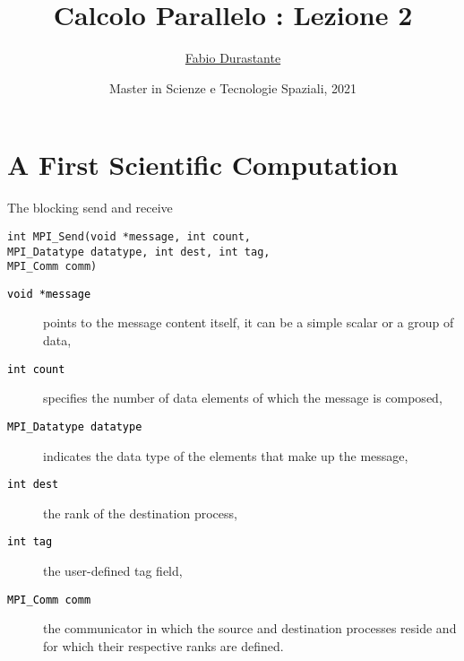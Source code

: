 \documentclass[xcolor={svgnames,usenames}]{beamer}
\title[Calcolo Parallelo]{Calcolo Parallelo : Lezione 2}
\author[F. Durastante]{
    \href{mailto:fabio.durastante@nunipi.it}{Fabio Durastante}
}
\institute{Dipartimento di Matematica, Università di Pisa}
\date[Maggio 2021]{Master in Scienze e Tecnologie Spaziali, 2021}
\begin{document}
\begin{frame}
	\titlepage
\end{frame}

\section[Outline]{}
\frame{\tableofcontents}

\section{A First Scientific Computation}

\begin{frame}[fragile]{The blocking send and receive}
\begin{verbatim}
int MPI_Send(void *message, int count, 
MPI_Datatype datatype, int dest, int tag, 
MPI_Comm comm)
\end{verbatim}
\begin{description}
	\item[\textcolor{black}{\texttt{void *message}}] points to the message content itself, it can be a simple scalar or a group of data,
	\item[\textcolor{black}{\texttt{int count}}] specifies the number of data elements of which the message is composed,
	\item[\textcolor{black}{\texttt{MPI_Datatype datatype}}] indicates the \alert{data type} of the elements that make up the message,
	\item[\textcolor{black}{\texttt{int dest}}] the rank of the destination process, 
	\item[\textcolor{black}{\texttt{int tag}}] the user-defined tag field, 
	\item[\textcolor{black}{\texttt{MPI_Comm comm}}] the communicator in which the source and destination processes reside and for which their respective
	ranks are defined.
\end{description}
\end{frame}
\end{document}
